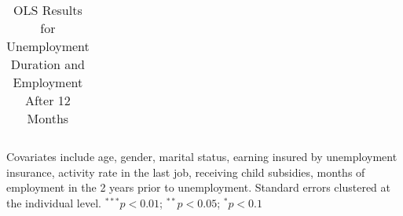 \begin{table}
\begin{center}
\begin{threeparttable}
\begin{tabular}{l D{.}{.}{5.5} D{.}{.}{5.5} D{.}{.}{5.5} D{.}{.}{5.5}}
\bottomrule
\end{tabular}
\begin{tablenotes}[flushleft]
\scriptsize{Covariates include age, gender, marital status, earning insured by unemployment insurance, activity rate in the last job, receiving child subsidies, months of employment in the 2 years prior to unemployment. Standard errors clustered at the individual level. $^{***}p<0.01$; $^{**}p<0.05$; $^{*}p<0.1$}
\end{tablenotes}
\end{threeparttable}
\caption{OLS Results for Unemployment Duration and Employment After 12 Months}
\label{tab:final_ols_results_combined}
\end{center}
\end{table}
